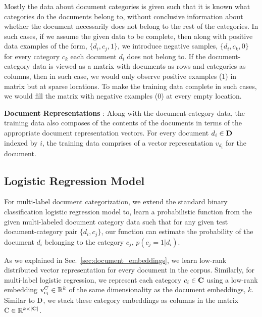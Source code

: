 Mostly the data about document categories is given such that it is known what categories do the documents belong to, without conclusive information about whether the document necessarily does not belong to the rest of the categories. In such cases, if we assume the given data to be complete, then along with positive data examples of the form, $\{ d_{i}, c_{j}, 1\}$, we introduce negative samples, $\{ d_{i}, c_{k}, 0\}$ for every category $c_{k}$ each document $d_{i}$ does not belong to. 
If the document-category data is viewed as a matrix with documents as rows and categories as columns, then in such case, we would only observe positive examples ($1$) in matrix but at sparse locations. To make the training data complete in such cases, we would fill the matrix with negative examples ($0$) at every empty location.

\textbf{Document Representations} : 
Along with the document-category data, the training data also composes of the contents of the documents in terms of the appropriate document representation vectors. For every document $d_{i} \in \mathbf{D}$ indexed by $i$, the training data comprises of a vector representation  $v_{d_{i}}$ for the document.

\subsection{Logistic Regression Model}
For multi-label document categorization, we extend the standard binary classification logistic regression model to, learn a probabilistic function from the given multi-labeled document category data such that for any given test document-category pair $\{d_{i}, c_{j}\}$, our function can estimate the probability of the document $d_{i}$ belonging to the category $c_{j}$, $p(c_{j}=1|d_{i})$.

As we explained in Sec.~\ref{sec:document_embeddings}, we learn low-rank distributed vector representation for every document in the corpus. Similarly, for multi-label logistic regression, we represent each category $c_{i} \in \mathbf{C}$ using a low-rank embedding $\mathrm{v}^{C}_{c_{i}} \in \mathbb{R}^{k}$ of the same dimensionality as the document embeddings, $k$. Similar to $\mathrm{D}$, we stack these category embeddings as columns in the matrix $\mathrm{C} \in \mathbb{R}^{k \times |\mathbf{C}|}$.

